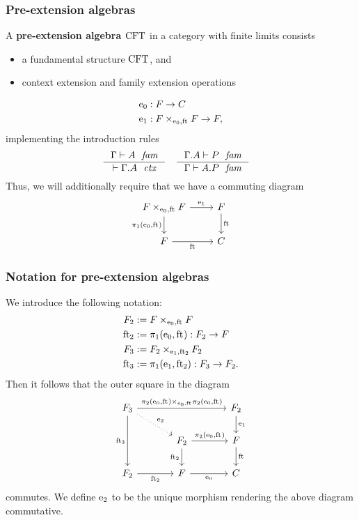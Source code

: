 \documentclass{beamer}
\newcommand\important[1]{\textbf{\color{red!90!black}#1}}
\begin{document}
\begin{frame}
\frametitle{\bf Pre-extension algebras}
A \important{pre-extension algebra $\mathrm{CFT}$} in a category with finite limits consists
\begin{itemize}
\item a fundamental structure $\mathrm{CFT}$, and
\item context extension and family extension operations
\end{itemize}
\begin{align*}
\ectxext%
  &%
: \stesysf \to \stesysc%
  \\
\efamext%
  &%
: \stesysff \to \stesysf,%
\end{align*}
\pause
implementing the introduction rules
\begin{align*}
& \inference
  { \jfam{\Gamma}{A}
    }
  { \jctx{\ctxext{\Gamma}{A}}
    }
& & \inference
  { \jfam{{\Gamma}{A}}{P}
    }
  { \jfam{\Gamma}{\ctxext{A}{P}}
    }
\end{align*}
\pause
Thus, we will additionally require that we have a commuting diagram
\begin{equation*}
\begin{tikzcd}[ampersand replacement=\&]
\stesysff 
  \ar{r}{\efamext} 
  \ar{d}[swap]{\pullbackpr{1}{\ectxext}{\eft}} 
  \& 
\stesysf 
  \ar{d}{\eft}
  \\
\stesysf
  \ar{r}[swap]{\eft} 
  \& 
\stesysc
\end{tikzcd}
\end{equation*}
\end{frame}

\begin{frame}
\frametitle{\bf Notation for pre-extension algebras}
We introduce the following notation:
\begin{align*}
\stesysf_2 
  & := \stesysff
  \\
\eft[2] 
  & := \pullbackpr{1}{\ectxext}{\eft} : \stesysf_2\to\stesysf
  \\
\stesysf_3 & := \pullback{\stesysf_2}{\stesysf_2}{\efamext}{\eft[2]}
  \\
\eft[3]
  & := \pullbackpr{1}{\efamext}{\eft[2]} : \stesysf_3\to\stesysf_2.
\end{align*}
\pause
Then it follows that the outer square in the diagram
\begin{equation*}
\begin{tikzcd}[ampersand replacement=\&,column sep=large]
\stesysf_3
  \ar[dotted]{dr}{\eext{2}}
  \ar{rr}{\pullback{\pullbackpr{2}{\ectxext}{\eft}}{\pullbackpr{2}{\ectxext}{\eft}}{\ectxext}{\eft}}
  \ar{dd}[swap]{\eft[3]}
  \& 
  \&
\stesysf_2
  \ar{d}{\efamext}
  \\
  \&
\stesysf_2
  \ar{d}[swap]{\eft[2]}
  \ar{r}{\pullbackpr{2}{\ectxext}{\eft}}
  \&
\stesysf
  \ar{d}{\eft}
  \\
\stesysf_2
  \ar{r}[swap]{\eft[2]}
  \&
\stesysf
  \ar{r}[swap]{\ectxext}
  \&
\stesysc
\end{tikzcd}
\end{equation*}
commutes. \pause
We define \important{$\mathrm{e}_{2}$} to be the unique morphism rendering the above diagram
commutative. 
\end{frame}
\end{document}
